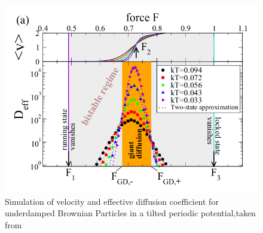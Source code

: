 \documentclass[12pt,a4paper]{article}
\begin{document}
\begin{figure}[H]
	\centering
	\includegraphics[scale=0.5]{nbpsim1.png}\caption{Simulation of velocity and effective diffusion coefficient for underdamped Brownian Particles in a tilted periodic potential,taken from \cite{bpp}}
	\label{anbpsimintro}
\end{figure}
\end{document}
